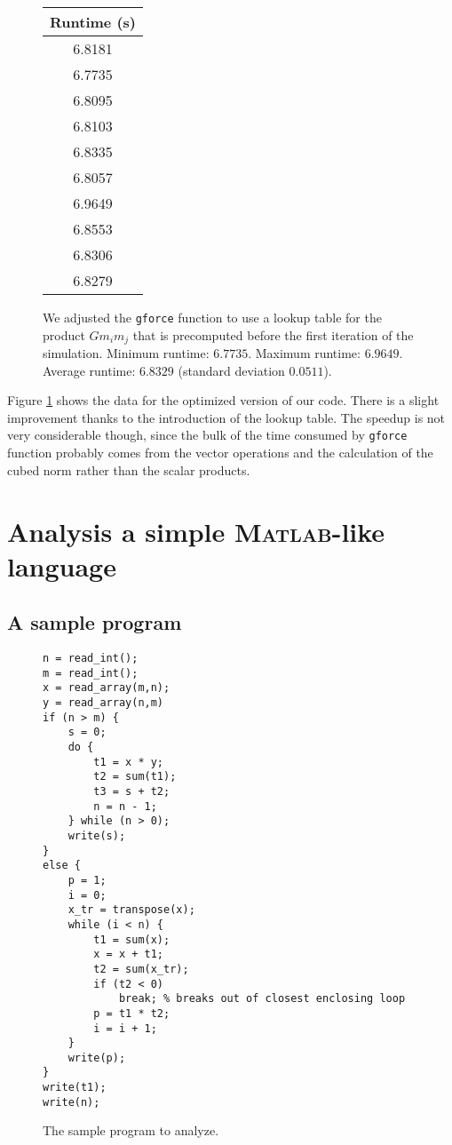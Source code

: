\documentclass[11pt,letterpaper]{article}
\newcommand{\matlab}{\textsc{Matlab}}
\begin{document}
\begin{figure}[ht]
    \centering
    \begin{tabular}{|c|}
        \hline
        \textbf{Runtime (s)} \\ \hline \hline
        6.8181 \\
        6.7735 \\
        6.8095 \\
        6.8103 \\
        6.8335 \\
        6.8057 \\
        6.9649 \\
        6.8553 \\
        6.8306 \\
        6.8279 \\ \hline
    \end{tabular}

    \caption{
        We adjusted the \texttt{gforce} function to use a lookup table for the
        product $G m_i m_j$ that is precomputed before the first iteration of
        the simulation. Minimum runtime: $6.7735$. Maximum runtime: $6.9649$.
        Average runtime: $6.8329$ (standard deviation $0.0511$).
    }
    \label{data:optimizedrun}
\end{figure}

Figure \ref{data:optimizedrun} shows the data for the optimized version of our
code. There is a slight improvement thanks to the introduction of the lookup
table. The speedup is not very considerable though, since the bulk of the time
consumed by \texttt{gforce} function probably comes from the vector operations
and the calculation of the cubed norm rather than the scalar products.

\section{Analysis a simple \matlab{}-like language}

\subsection{A sample program}

\begin{figure}[ht]
    \begin{lstlisting}
n = read_int();
m = read_int();
x = read_array(m,n);
y = read_array(n,m)
if (n > m) {
    s = 0;
    do {
        t1 = x * y;
        t2 = sum(t1);
        t3 = s + t2;
        n = n - 1;
    } while (n > 0);
    write(s);
}
else {
    p = 1;
    i = 0;
    x_tr = transpose(x);
    while (i < n) {
        t1 = sum(x);
        x = x + t1;
        t2 = sum(x_tr);
        if (t2 < 0)
            break; % breaks out of closest enclosing loop
        p = t1 * t2;
        i = i + 1;
    }
    write(p);
}
write(t1);
write(n);
    \end{lstlisting}

    \caption{The sample program to analyze.}
    \label{fig:sample-program}
\end{figure}
\end{document}
